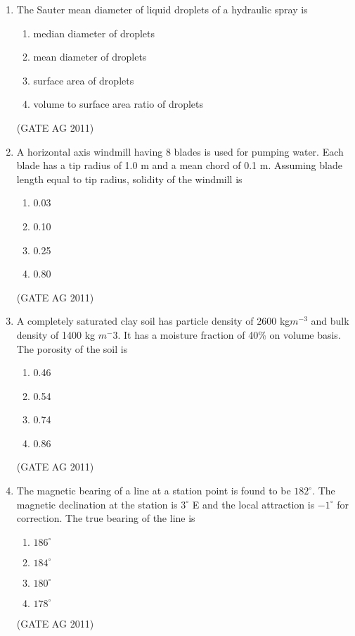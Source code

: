 \documentclass[journal,12pt,onecolumn]{IEEEtran}
\theoremstyle{remark}
\begin{document}
\begin{enumerate}
\item The Sauter mean diameter of liquid droplets of a hydraulic spray is
\begin{multicols}{4}
\begin{enumerate}
\item median diameter of droplets 
\item mean diameter of droplets 
\item surface area of droplets 
\item volume to surface area ratio of droplets
\end{enumerate}
\end{multicols}
\hfill{(GATE AG 2011)}


\item A horizontal axis windmill having 8 blades is used for pumping water. Each blade has a tip radius of 1.0 m and a mean chord of 0.1 m. Assuming blade length equal to tip radius, solidity of the windmill is
\begin{multicols}{4}
\begin{enumerate}
\item 0.03 
\item 0.10 
\item 0.25 
\item 0.80
\end{enumerate}
\end{multicols}
\hfill{(GATE AG 2011)}

\item A completely saturated clay soil has particle density of 2600 kg${ m}^{-3}$ and bulk density of 1400 kg ${m^-3}$. It has a moisture fraction of 40\% on volume basis. The porosity of the soil is
\begin{multicols}{4}
\begin{enumerate}
\item 0.46 
\item 0.54
\item 0.74 
\item 0.86
\end{enumerate}
\end{multicols}
\hfill{(GATE AG 2011)}

\item The magnetic bearing of a line at a station point is found to be $182^\circ$. 
The magnetic declination at the station is $3^\circ$ E and the local attraction is $-1^\circ$ for correction. 
The true bearing of the line is
\begin{multicols}{4}
\begin{enumerate}
\item $186^\circ$
\item $184^\circ$
\item $180^\circ$
\item $178^\circ$
\end{enumerate}
\end{multicols}
\hfill{(GATE AG 2011)}


\end{enumerate}
\end{document}
